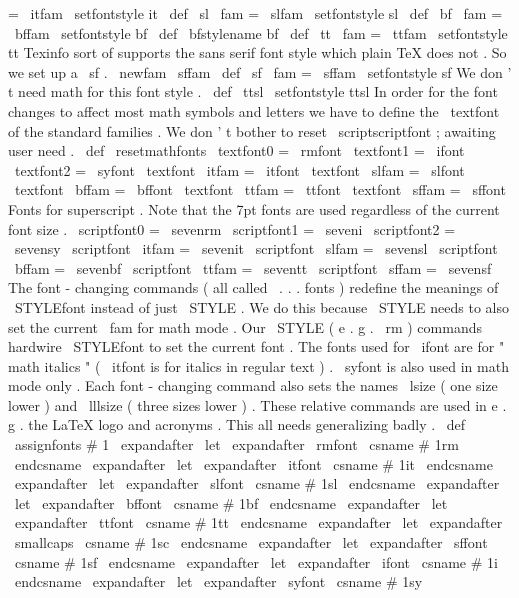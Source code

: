 {{{{=
\
itfam
\
setfontstyle
{
it
}
}
\
def
\
sl
{
\
fam
=
\
slfam
\
setfontstyle
{
sl
}
}
\
def
\
bf
{
\
fam
=
\
bffam
\
setfontstyle
{
bf
}
}
\
def
\
bfstylename
{
bf
}
\
def
\
tt
{
\
fam
=
\
ttfam
\
setfontstyle
{
tt
}
}
%
Texinfo
sort
of
supports
the
sans
serif
font
style
which
plain
TeX
does
not
.
%
So
we
set
up
a
\
sf
.
\
newfam
\
sffam
\
def
\
sf
{
\
fam
=
\
sffam
\
setfontstyle
{
sf
}
}
%
We
don
'
t
need
math
for
this
font
style
.
\
def
\
ttsl
{
\
setfontstyle
{
ttsl
}
}
%
In
order
for
the
font
changes
to
affect
most
math
symbols
and
letters
%
we
have
to
define
the
\
textfont
of
the
standard
families
.
%
We
don
'
t
bother
to
reset
\
scriptscriptfont
;
awaiting
user
need
.
%
\
def
\
resetmathfonts
{
%
\
textfont0
=
\
rmfont
\
textfont1
=
\
ifont
\
textfont2
=
\
syfont
\
textfont
\
itfam
=
\
itfont
\
textfont
\
slfam
=
\
slfont
\
textfont
\
bffam
=
\
bffont
\
textfont
\
ttfam
=
\
ttfont
\
textfont
\
sffam
=
\
sffont
%
%
Fonts
for
superscript
.
Note
that
the
7pt
fonts
are
used
regardless
%
of
the
current
font
size
.
\
scriptfont0
=
\
sevenrm
\
scriptfont1
=
\
seveni
\
scriptfont2
=
\
sevensy
\
scriptfont
\
itfam
=
\
sevenit
\
scriptfont
\
slfam
=
\
sevensl
\
scriptfont
\
bffam
=
\
sevenbf
\
scriptfont
\
ttfam
=
\
seventt
\
scriptfont
\
sffam
=
\
sevensf
}
%
%
The
font
-
changing
commands
(
all
called
\
.
.
.
fonts
)
redefine
the
meanings
%
of
\
STYLEfont
instead
of
just
\
STYLE
.
We
do
this
because
\
STYLE
needs
%
to
also
set
the
current
\
fam
for
math
mode
.
Our
\
STYLE
(
e
.
g
.
\
rm
)
%
commands
hardwire
\
STYLEfont
to
set
the
current
font
.
%
%
The
fonts
used
for
\
ifont
are
for
"
math
italics
"
(
\
itfont
is
for
italics
%
in
regular
text
)
.
\
syfont
is
also
used
in
math
mode
only
.
%
%
Each
font
-
changing
command
also
sets
the
names
\
lsize
(
one
size
lower
)
%
and
\
lllsize
(
three
sizes
lower
)
.
These
relative
commands
are
used
%
in
e
.
g
.
the
LaTeX
logo
and
acronyms
.
%
%
This
all
needs
generalizing
badly
.
%
\
def
\
assignfonts
#
1
{
%
\
expandafter
\
let
\
expandafter
\
rmfont
\
csname
#
1rm
\
endcsname
\
expandafter
\
let
\
expandafter
\
itfont
\
csname
#
1it
\
endcsname
\
expandafter
\
let
\
expandafter
\
slfont
\
csname
#
1sl
\
endcsname
\
expandafter
\
let
\
expandafter
\
bffont
\
csname
#
1bf
\
endcsname
\
expandafter
\
let
\
expandafter
\
ttfont
\
csname
#
1tt
\
endcsname
\
expandafter
\
let
\
expandafter
\
smallcaps
\
csname
#
1sc
\
endcsname
\
expandafter
\
let
\
expandafter
\
sffont
\
csname
#
1sf
\
endcsname
\
expandafter
\
let
\
expandafter
\
ifont
\
csname
#
1i
\
endcsname
\
expandafter
\
let
\
expandafter
\
syfont
\
csname
#
1sy
}}}}
